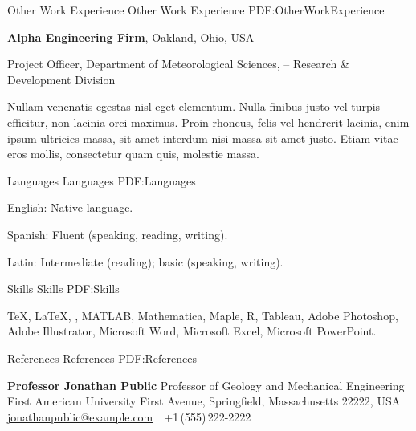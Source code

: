 \documentclass[letterpaper,MMMyyyy,nonstopmode]{simpleresumecv}
\begin{document}
\begin{Body}
\begin{Detail}
\begin{Detail}
\begin{Detail}

\Section
{Other Work\newline
Experience}
{Other Work Experience}
{PDF:OtherWorkExperience}

\Entry
\href{http://www.example.com/my-company}
{\textbf{Alpha Engineering Firm}},
Oakland, Ohio, USA

\Gap
\BulletItem
Project Officer,
Department of Meteorological Sciences,
\hfill
{} --
\newline
Research \& Development Division
\begin{Detail}
\SubBulletItem
Nullam venenatis egestas nisl eget elementum.
\SubBulletItem
Nulla finibus justo vel turpis efficitur, non lacinia orci maximus. Proin rhoncus, felis vel hendrerit lacinia, enim ipsum ultricies massa, sit amet interdum nisi massa sit amet justo.
\SubBulletItem
Etiam vitae eros mollis, consectetur quam quis, molestie massa.
\end{Detail}


\Section
{Languages}
{Languages}
{PDF:Languages}

\BulletItem
English: Native language.

\Gap
\BulletItem
Spanish: Fluent (speaking, reading, writing).

\Gap
\BulletItem
Latin: Intermediate (reading); basic (speaking, writing).


\Section
{Skills}
{Skills}
{PDF:Skills}

\Entry
{\TeX}, {\LaTeX}, {\XeLaTeX},
MATLAB,
Mathematica,
Maple,
R,
Tableau,
Adobe Photoshop,
Adobe Illustrator,
Microsoft Word,
Microsoft Excel,
Microsoft PowerPoint.





\Section
{References}
{References}
{PDF:References}

\BulletItem
\textbf{Professor Jonathan Public}
\newline
Professor of Geology and Mechanical Engineering
\newline
First American University
 First Avenue, Springfield, Massachusetts 22222, USA
\newline
\href{mailto:jonathanpublic@example.com}
{jonathanpublic@example.com}
\,\SubBulletSymbol\,
+1\,(555)\,222-2222


\end{Detail}
\end{Detail}
\end{Detail}
\end{Body}
\end{document}
